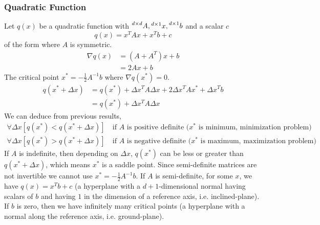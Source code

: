 \documentclass{article}
\numberwithin{equation}{subsection}
\begin{document}
\subsubsection{Quadratic Function}
Let $q(x)$ be a quadratic function with $\prescript{d \times d}{}{A}, \prescript{d \times 1}{}{x}, \prescript{d \times 1}{}{b}$ and a scalar $c$
\begin{equation}
    q(x) = x^TAx+x^Tb+c
\end{equation}
of the form where $A$ is symmetric.
\begin{align}
    \nabla q(x) &= (A+A^T)x+b\\
     &= 2Ax+b
\end{align}
The critical point $x^* = -\frac{1}{2}A^{-1}b$ where $\nabla q(x^*) = 0$.
\begin{align}
    q(x^*+\Delta x) &= q(x^*) + \Delta x^TA\Delta x + 2\Delta x^TAx^* + \Delta x^Tb\\
    &= q(x^*) + \Delta x^TA\Delta x
\end{align}
We can deduce from previous results, 
\begin{align}
    \forall \Delta x [q(x^*) < q(x^*+\Delta x)] & \ \text{if $A$ is positive definite ($x^*$ is minimum, minimization problem)}\\
    \forall \Delta x [q(x^*) > q(x^*+\Delta x)] & \ \text{if $A$ is negative definite ($x^*$ is maximum, maximization problem)}
\end{align}
If $A$ is indefinite, then depending on $\Delta x$, $q(x^*)$ can be less or greater than $q(x^*+\Delta x)$, which means $x^*$ is a saddle point. Since semi-definite matrices are not invertible we cannot use $x^* = -\frac{1}{2}A^{-1}b$. If $A$ is semi-definite, for some $x$, we have $q(x) = x^Tb+c$ (a hyperplane with a $d+1$-dimensional normal having scalars of $b$ and having $1$ in the dimension of a reference axis, i.e. inclined-plane). If $b$ is zero, then we have infinitely many critical points (a hyperplane with a normal along the reference axis, i.e. ground-plane).
\end{document}
